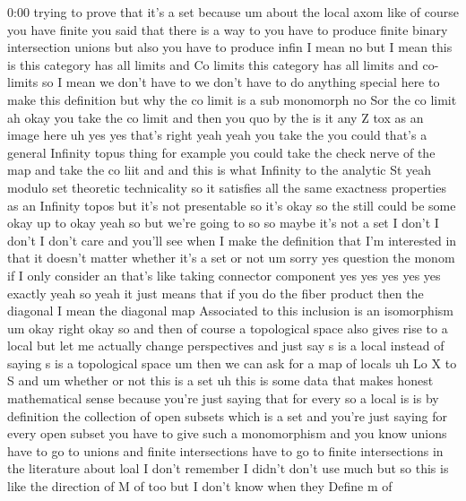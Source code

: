 \begin{unfinished}{0:00}
trying  to  prove  that  it's  a  set  because
um  about  the  local  axom  like  of  course
you  have  finite  you  said  that  there  is  a
way  to  you  have  to  produce  finite  binary
intersection  unions  but  also  you  have  to
produce  infin  I  mean  no  but  I  mean  this
is  this  category  has  all  limits  and  Co
limits  this  category  has  all  limits  and
co-  limits  so  I  mean  we  don't  have  to  we
don't  have  to  do  anything  special  here
to  make  this
definition  but  why  the  co  limit  is  a  sub
monomorph  no  Sor  the  co  limit  ah  okay
you  take  the  co  limit  and  then  you  quo
by  the
is  it  any  Z  tox  as  an  image
here  uh  yes  yes  that's  right  yeah  yeah
you  take  the  you  could  that's  a  general
Infinity  topus  thing  for  example  you
could  take  the  check  nerve  of  the  map
and  take  the  co  liit  and  and  this  is
what  Infinity  to  the  analytic  St  yeah
modulo  set  theoretic  technicality  so  it
satisfies  all  the  same  exactness
properties  as  an  Infinity  topos  but  it's
not  presentable  so  it's  okay  so  the
still  could  be
some  okay  up  to  okay  yeah  so  but  we're
going  to  so  so  maybe  it's  not  a  set  I
don't  I  don't  I  don't  care  and  you'll
see  when  I  make  the  definition  that  I'm
interested  in  that  it  doesn't  matter
whether  it's  a  set  or  not  um  sorry  yes
question  the  monom  if  I  only  consider  an
that's  like  taking  connector  component
yes  yes  yes  yes  yes
exactly  yeah  so  yeah  it  just  means  that
if  you  do  the  fiber  product  then  the
diagonal  I  mean  the  diagonal  map
Associated  to  this  inclusion  is  an
isomorphism  um  okay  right  okay  so  and
then  of  course  a  topological  space  also
gives  rise  to  a  local  but  let  me
actually  change  perspectives  and  just
say  s  is  a  local  instead  of  saying  s  is
a  topological  space  um  then  we  can  ask
for  a
map  of
locals  uh  Lo  X  to
S  and  um  whether  or  not  this  is  a  set  uh
this  is  some  data  that  makes  honest
mathematical  sense  because  you're  just
saying  that  for  every  so  a  local  is  is
by  definition  the  collection  of  open
subsets  which  is  a  set  and  you're  just
saying  for  every  open  subset  you  have  to
give  such  a
monomorphism  and  you  know  unions  have  to
go  to  unions  and  finite  intersections
have  to  go  to  finite  intersections  in
the  literature  about  loal  I  don't
remember  I  didn't  don't  use  much  but  so
this  is  like  the  direction  of  M  of  too
but  I  don't  know  when  they  Define  m  of

\end{unfinished}
